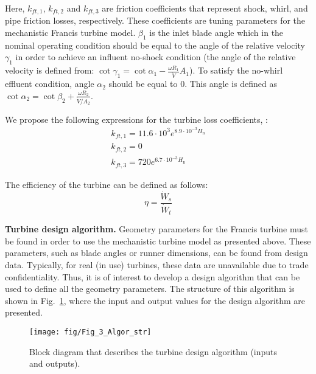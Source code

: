 \documentclass[%
]{USN-PhD}
\begin{document}
Here, $k_{ft,1}$, $k_{ft,2}$ and $k_{ft,3}$ are friction coefficients that represent shock, whirl, and pipe friction losses, respectively. These coefficients are tuning parameters for the mechanistic Francis turbine model. $\beta_1$ is the inlet blade angle which in the nominal operating condition should be equal to the angle of the relative velocity $\gamma_1$ in order to achieve an influent no-shock condition (the angle of the relative velocity is defined from: $\cot{\gamma_1}=\cot{\alpha_1}-\frac{\omega R_1}{\dot{V}}A_1$). To satisfy the no-whirl effluent condition, angle $\alpha_2$ should be equal to 0. This angle is defined as $\cot{\alpha_2}=\cot{\beta_2}+\frac{\omega R_2}{\dot{V}/A_2}$.

We propose the following expressions for the turbine loss coefficients, \cite{Vyt:19b}:
\begin{equation}
\begin{array}{c}
k_{ft,1} = 11.6\cdot10^3e^{8.9\cdot10^{-3}H_\mathrm{n}}\\
k_{ft,2} = 0\\
k_{ft,3} = 720e^{6.7\cdot10^{-3}H_\mathrm{n}}
\end{array}
\end{equation}

The efficiency of the turbine can be defined as follows:
\begin{equation} \label{eq:eq40}
{\eta} = \frac{\dot{W}_{s}}{\dot{W}_{t}}
\end{equation}

\textbf{Turbine design algorithm.} Geometry parameters for the Francis turbine must be found in order to use the mechanistic turbine model as presented above. These parameters, such as blade angles or runner dimensions, can be found from design data. Typically, for real (in use) turbines, these data are unavailable due to trade confidentiality. Thus, it is of interest to develop a design algorithm that can be used to define all the geometry parameters. The structure of this algorithm is shown in Fig.~\ref{fig:fig12}, where the input and output values for the design algorithm are presented.

\begin{figure}
\begin{center}
\texttt{[image: fig/Fig\_3\_Algor\_str]} %
\caption{Block diagram that describes the turbine design algorithm (inputs and outputs).}
\label{fig:fig12}
\end{center}
\end{figure}
\end{document}
